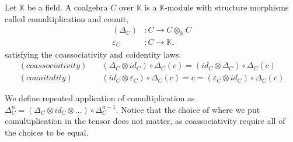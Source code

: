 \documentclass[../../thesis.tex]{subfiles}
\begin{document}
            \begin{definition}[Coalgebra]
                Let $\mathbb{K}$ be a field. A coalgebra $C$ over $\mathbb{K}$ is a $\mathbb{K}$-module with structure morphisms called comultiplication and counit,
                \begin{align*}
                    (\Delta_C) & : C \rightarrow C\otimes_{\mathbb{K}}C \\
                    \varepsilon_C & : C \rightarrow \mathbb{K},
                \end{align*}
                satisfying the coassociativity and coidentity laws. 
                \begin{align*}
                    (coassociativity)\quad & (\Delta_C\otimes id_C)\circ\Delta_C(c) = (id_C\otimes\Delta_C)\circ\Delta_C(c) \\
                    (counitality) \quad & (id_C\otimes\varepsilon_C)\circ\Delta_C(c) = c = (\varepsilon_C\otimes id_C)\circ\Delta_C(c)
                \end{align*}
            \end{definition}

            We define repeated application of comultiplication as $\Delta_C^n = (\Delta_C\otimes id_C\otimes ...)\circ\Delta_C^{n-1}$. Notice that the choice of where we put comultiplication in the tensor does not matter, as coassociativity require all of the choices to be equal.
\end{document}
